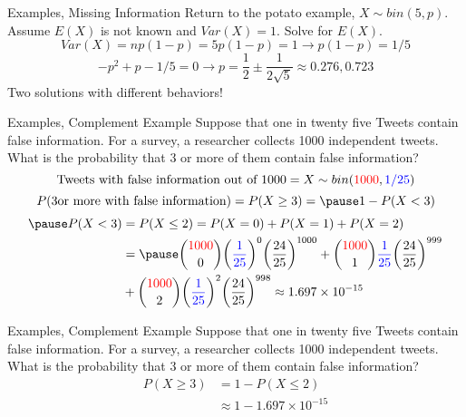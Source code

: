 \documentclass[handout]{beamer}
\newcommand{\blue}[1]{{\color{blue} #1}}
\newcommand{\red}[1]{{\color{red} #1}}
\newcommand{\nl}[1]{\vspace{#1 em}}
\begin{document}
    \begin{frame}{Examples, Missing Information}
        Return to the potato example, $X\sim bin(5,p)$. Assume $E(X)$ is not known and $Var(X)=1$. Solve for $E(X)$.
        \\ \nl{0.5}
        \pause $$ Var(X) = np(1-p) = 5p(1-p) = 1 \rightarrow p(1-p) = 1/5 $$
        \pause $$ -p^2 + p - 1/5 = 0 \rightarrow p = \frac{1}{2} \pm \frac{1}{2\sqrt{5}} \approx 0.276,0.723$$
        \pause Two solutions with different behaviors!
    \end{frame}
    \begin{frame}{Examples, Complement Example}
        Suppose that \blue{one in twenty five Tweets contain false information}. For a survey, a researcher collects \red{1000 independent tweets}. What is the probability that 3 or more of them contain false information?
        \\ \nl{0.5}
        \pause $$\text{Tweets with false information out of } 1000 = X \sim bin(\red{1000}, \blue{1/25})$$
        \pause $$ P(3 \text{or more with false information}) = P(X\geq 3) = \pause 1- P(X<3)$$
        \begin{align*}
            \pause P(X<3) &= P(X\leq 2) = P(X=0) + P(X=1) + P(X=2) \\
            & = \pause \binom{\red{1000}}{0} \bigg(\blue{\frac{1}{25}}\bigg)^0\bigg( \frac{24}{25}\bigg)^{1000} + \binom{\red{1000}}{1} \blue{\frac{1}{25}}\bigg( \frac{24}{25}\bigg)^{999}\\
            & + \binom{\red{1000}}{2} \bigg(\blue{\frac{1}{25}}\bigg)^{2} \bigg( \frac{24}{25}\bigg)^{998} 
            \approx 1.697 \times 10^{-15}
        \end{align*}
    \end{frame}
    \begin{frame}{Examples, Complement Example}
        Suppose that \blue{one in twenty five Tweets contain false information}. For a survey, a researcher collects \red{1000 independent tweets}. What is the probability that 3 or more of them contain false information?
        \\ \nl{0.5}
        \begin{align*}
            P(X\geq 3) &= 1- P(X\leq 2) \\
             & \approx 1-1.697 \times 10^{-15}\\
        \end{align*}
    \end{frame}
\end{document}
